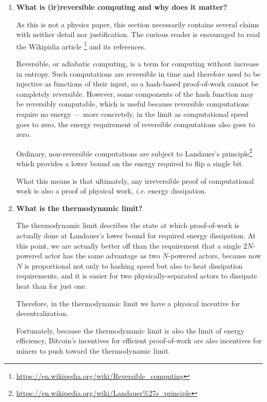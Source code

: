 \documentclass[letterpaper]{article}
\theoremstyle{xxx}
\theoremstyle{evil}
\theoremstyle{yyy}
\theoremstyle{plain}
\theoremstyle{zzz}
\begin{document}
\begin{enumerate}

\item \textbf{What is (ir)reversible computing and why does it matter?}

As this is not a physics paper, this section necessarily contains
several claims with neither detail nor justification. The curious
reader is encouraged to read the Wikipidia article
\footnote{\url{https://en.wikipedia.org/wiki/Reversible_computing}}
and its references.

Reversible, or adiabatic computing, is a term for computing without
increase in entropy. Such computations are reversible in time and
therefore need to be injective as functions of their input, so a
hash-based proof-of-work cannot be completely reversible. However,
some components of the hash function may be reversibly computable,
which is useful because reversible computations require no energy
--- more concretely, in the limit as computational speed goes to
zero, the energy requirement of reversible computations also goes
to zero.

Ordinary, non-reversible computations are subject to Landauer's
principle\footnote{\url{https://en.wikipedia.org/wiki/Landauer\%27s_principle}}
which provides a lower bound on the energy required to flip a
single bit.

What this means is that ultimately, any irreversible proof of
computational work is also a proof of physical work, \emph{i.e.}
energy dissipation.

\item \textbf{What is the thermodynamic limit?}

The thermodynamic limit describes the state at which proof-of-work
is actually done at Landauer's lower bound for required energy
dissipation. At this point, we are actually better off than the
requirement that a single $2N$-powered actor has the same advantage
as two $N$-powered actors, because now $N$ is proportional not only
to hashing speed but also to heat dissipation requirements, and it
is easier for two physically-separated actors to dissipate heat than
for just one.

Therefore, in the thermodynamic limit we have a physical incentive
for decentralization.

Fortunately, because the thermodynamic limit is also the limit of
energy efficiency, Bitcoin's incentives for efficient proof-of-work
are also incentives for miners to push toward the thermodynamic
limit.


\end{enumerate}
\end{document}
